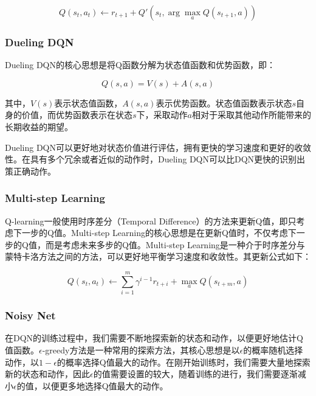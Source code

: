 \documentclass{article}
\begin{document}
\begin{equation}
	Q(s_t, a_t) \leftarrow r_{t+1} + Q'\left(s_t,\arg\max_{a} Q(s_{t+1}, a)\right)
	\label{eq:double-q-learning}
\end{equation}

\subsubsection{Dueling DQN}

Dueling DQN的核心思想是将Q函数分解为状态值函数和优势函数，即：

\begin{equation}
	Q(s, a) = V(s) + A(s, a)
	\label{eq:dueling-dqn}
\end{equation}

其中，$V(s)$表示状态值函数，$A(s, a)$表示优势函数。状态值函数表示状态$s$自身的价值，而优势函数表示在状态$s$下，采取动作$a$相对于采取其他动作所能带来的长期收益的期望。

Dueling DQN可以更好地对状态价值进行评估，拥有更快的学习速度和更好的收敛性。在具有多个冗余或者近似的动作时，Dueling DQN可以比DQN更快的识别出策正确动作。

\subsubsection{Multi-step Learning}

Q-learning一般使用时序差分（Temporal Difference）的方法来更新Q值，即只考虑下一步的Q值。Multi-step Learning的核心思想是在更新Q值时，不仅考虑下一步的Q值，而是考虑未来多步的Q值。Multi-step Learning是一种介于时序差分与蒙特卡洛方法之间的方法，可以更好地平衡学习速度和收敛性。其更新公式如下：

\begin{equation}
	Q(s_t, a_t) \leftarrow \sum^{m}_{i=1}\gamma^{i-1} r_{t+i} + \max_{a} Q(s_{t+m}, a)
	\label{eq:multi-step-learning}
\end{equation}

\subsubsection{Noisy Net}

在DQN的训练过程中，我们需要不断地探索新的状态和动作，以便更好地估计Q值函数。$\epsilon$-greedy方法是一种常用的探索方法，其核心思想是以$\epsilon$的概率随机选择动作，以$1-\epsilon$的概率选择Q值最大的动作。在刚开始训练时，我们需要大量地探索新的状态和动作，因此$\epsilon$的值需要设置的较大，随着训练的进行，我们需要逐渐减小$\epsilon$的值，以便更多地选择Q值最大的动作。
\end{document}
